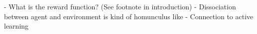 \label{conclusion}


- What is the reward function? (See footnote in introduction)
- Dissociation between agent and environment is kind of homunculus like
- Connection to active learning